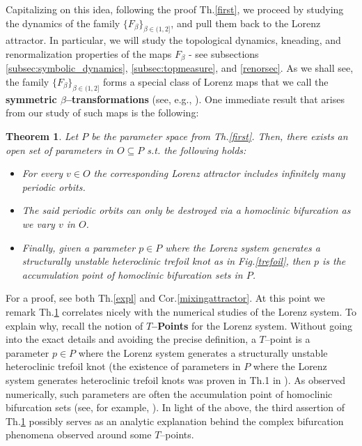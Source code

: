 \documentclass[10pt,reqno]{amsart}
\theoremstyle{plain}
\theoremstyle{assumption}
\theoremstyle{notation}
\theoremstyle{claim}
\theoremstyle{conj}
\theoremstyle{theorem}
\newtheorem{theorem}{Theorem}[section]
\theoremstyle{proposition}
\theoremstyle{corollary}
\begin{document}
Capitalizing on this idea, following the proof Th.\ref{first}, we proceed by studying the dynamics of the family $\{F_\beta\}_{\beta\in(1,2]}$, and pull them back to the Lorenz attractor. In particular, we will study the topological dynamics, kneading, and renormalization properties of the maps $F_\beta$ - see subsections \ref{subsec:symbolic_dynamics}, \ref{subsec:topmeasure}, and \ref{renorsec}. As we shall see, the family $\{F_\beta\}_{\beta\in(1,2]}$ forms a special class of Lorenz maps that we call the \textbf{symmetric $\beta$--transformations} (see, e.g., \cite{ParryL}). One immediate result that arises from our study of such maps is the following:
\begin{theorem}
    \label{second} Let $P$ be the parameter space from Th.\ref{first}. Then, there exists an open set of parameters in $O\subseteq P$ s.t. the following holds:
    
    \begin{itemize}
        \item For every $v\in O$ the corresponding Lorenz attractor includes infinitely many periodic orbits. 
        \item The said periodic orbits can only be destroyed via a homoclinic bifurcation as we vary $v$ in $O$. 
        \item Finally, given a parameter $p\in P$ where the Lorenz system generates a structurally unstable heteroclinic trefoil knot as in Fig.\ref{trefoil}, then $p$ is the accumulation point of homoclinic bifurcation sets in $P$.
    \end{itemize}

\end{theorem}
For a proof, see both Th.\ref{expl} and Cor.\ref{mixingattractor}. At this point we remark Th.\ref{second} correlates nicely with the numerical studies of the Lorenz system. To explain why, recall the notion of \textbf{$T$--Points} for the Lorenz system. Without going into the exact details and avoiding the precise definition, a $T$--point is a parameter $p\in P$ where the Lorenz system generates a structurally unstable heteroclinic trefoil knot (the existence of parameters in $P$ where the Lorenz system generates heteroclinic trefoil knots was proven in Th.1 in \cite{Pi}). As observed numerically, such parameters are often the accumulation point of homoclinic bifurcation sets (see, for example, \cite{BSS}). In light of the above, the third assertion of Th.\ref{second} possibly serves as an analytic explanation behind the complex bifurcation phenomena observed around some $T$--points.
\end{document}
